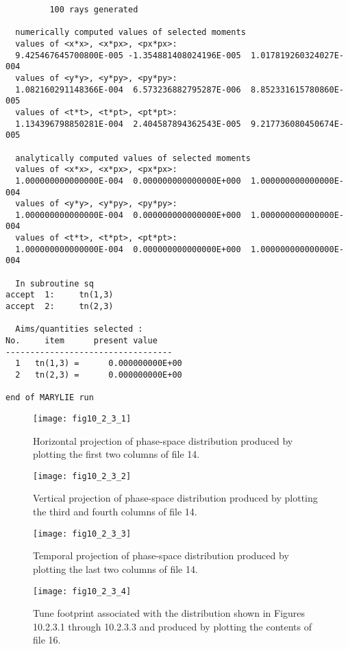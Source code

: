 \begin{footnotesize}
\begin{verbatim}
         100 rays generated

  numerically computed values of selected moments
  values of <x*x>, <x*px>, <px*px>:
  9.425467645700800E-005 -1.354881408024196E-005  1.017819260324027E-004
  values of <y*y>, <y*py>, <py*py>:
  1.082160291148366E-004  6.573236882795287E-006  8.852331615780860E-005
  values of <t*t>, <t*pt>, <pt*pt>:
  1.134396798850281E-004  2.404587894362543E-005  9.217736080450674E-005

  analytically computed values of selected moments
  values of <x*x>, <x*px>, <px*px>:
  1.000000000000000E-004  0.000000000000000E+000  1.000000000000000E-004
  values of <y*y>, <y*py>, <py*py>:
  1.000000000000000E-004  0.000000000000000E+000  1.000000000000000E-004
  values of <t*t>, <t*pt>, <pt*pt>:
  1.000000000000000E-004  0.000000000000000E+000  1.000000000000000E-004

  In subroutine sq
accept  1:     tn(1,3)
accept  2:     tn(2,3)

  Aims/quantities selected :
No.     item      present value
----------------------------------
  1   tn(1,3) =      0.000000000E+00
  2   tn(2,3) =      0.000000000E+00

end of MARYLIE run
\end{verbatim}
\end{footnotesize}


\newpage
\renewcommand{\thefigure}{\arabic{chapter}.\arabic{section}.\arabic{subsection}.\arabic{figure}}
\setcounter{figure}{0}
\begin{figure}[h]
  \centering
  \texttt{[image: fig10\_2\_3\_1]}
  \caption{Horizontal projection of phase-space distribution produced by plotting the first two columns of file 14.}
\end{figure}


\begin{figure}[h]
  \centering
  \texttt{[image: fig10\_2\_3\_2]}
  \caption{Vertical projection of phase-space distribution produced by plotting the third and fourth columns of file 14.}
\end{figure}

\newpage
\begin{figure}[h]
  \centering
  \texttt{[image: fig10\_2\_3\_3]}
  \caption{Temporal projection of phase-space distribution produced by plotting the last two columns of file 14.}
\end{figure}

\begin{figure}[h]
  \centering
  \texttt{[image: fig10\_2\_3\_4]}
  \caption{Tune footprint associated with the distribution shown in Figures 10.2.3.1 through 10.2.3.3 and produced by plotting the contents of file 16.}
\end{figure}


